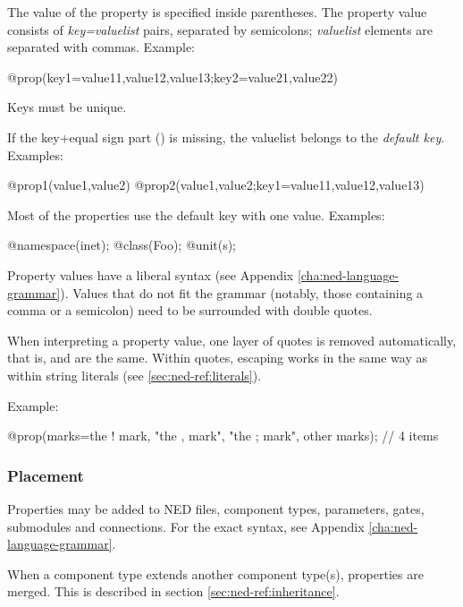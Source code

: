 The value of the property is specified inside parentheses. The property value consists of
\textit{key=valuelist} pairs, separated by semicolons; \textit{valuelist} elements
are separated with commas. Example:

\begin{ned}
@prop(key1=value11,value12,value13;key2=value21,value22)
\end{ned}

Keys must be unique.

If the key+equal sign part () is missing, the valuelist belongs
to the \textit{default key}. Examples:

\begin{ned}
@prop1(value1,value2)
@prop2(value1,value2;key1=value11,value12,value13)
\end{ned}

Most of the properties use the default key with one value. Examples:

\begin{ned}
@namespace(inet);
@class(Foo);
@unit(s);
\end{ned}

Property values have a liberal syntax (see Appendix \ref{cha:ned-language-grammar}).
Values that do not fit the grammar (notably, those containing a comma or
a semicolon) need to be surrounded with double quotes.

When interpreting a property value, one layer of quotes is removed
automatically, that is,  and  are the same.
Within quotes, escaping works in the same way as within string literals
(see \ref{sec:ned-ref:literals}).

Example:

\begin{ned}
@prop(marks=the ! mark, "the , mark", "the ; mark", other marks); // 4 items
\end{ned}


\subsubsection{Placement}
\label{sec:ned-ref:property-placement}

Properties may be added to NED files, component types, parameters,
gates, submodules and connections. For the exact syntax, see
Appendix \ref{cha:ned-language-grammar}.

When a component type extends another component type(s), properties
are merged. This is described in section \ref{sec:ned-ref:inheritance}.


